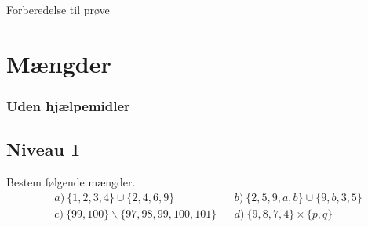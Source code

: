 \documentclass[12pt]{article}
\begin{document}




\begin{center}
\Huge
Forberedelse til prøve
\end{center}

\section*{Mængder}

\subsubsection*{Uden hjælpemidler}

\subsection*{Niveau 1}

Bestem følgende mængder.
\begin{align*}
	&a) \  \{1,2,3,4\} \cup \{2,4,6,9\}     &&b)  \  \{2,5,9,a,b\} \cup \{9,b,3,5\}    \\
	&c) \  \{99,100\} \backslash \{97,98,99,100,101\}     &&d)  \  \{9,8,7,4\} \times \{p,q\}    \\	
\end{align*}
\end{document}
